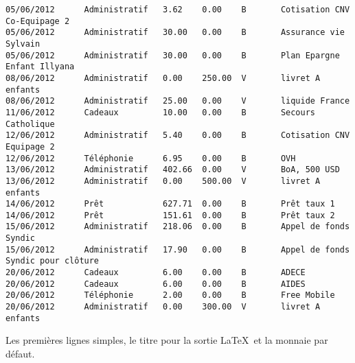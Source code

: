 \begin{verbatim}
05/06/2012      Administratif   3.62    0.00    B       Cotisation CNV Co-Equipage 2
05/06/2012      Administratif   30.00   0.00    B       Assurance vie Sylvain
05/06/2012      Administratif   30.00   0.00    B       Plan Epargne Enfant Illyana
08/06/2012      Administratif   0.00    250.00  V       livret A enfants
08/06/2012      Administratif   25.00   0.00    V       liquide France
11/06/2012      Cadeaux         10.00   0.00    B       Secours Catholique
12/06/2012      Administratif   5.40    0.00    B       Cotisation CNV Equipage 2
12/06/2012      Téléphonie      6.95    0.00    B       OVH
13/06/2012      Administratif   402.66  0.00    V       BoA, 500 USD
13/06/2012      Administratif   0.00    500.00  V       livret A enfants
14/06/2012      Prêt            627.71  0.00    B       Prêt taux 1
14/06/2012      Prêt            151.61  0.00    B       Prêt taux 2
15/06/2012      Administratif   218.06  0.00    B       Appel de fonds Syndic
15/06/2012      Administratif   17.90   0.00    B       Appel de fonds Syndic pour clôture
20/06/2012      Cadeaux         6.00    0.00    B       ADECE
20/06/2012      Cadeaux         6.00    0.00    B       AIDES
20/06/2012      Téléphonie      2.00    0.00    B       Free Mobile
20/06/2012      Administratif   0.00    300.00  V       livret A enfants
\end{verbatim}
\normalsize
Les premières lignes simples, le titre pour la sortie \LaTeX\
et la monnaie par défaut.
